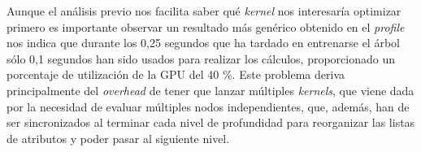 Aunque el análisis previo nos facilita saber qué \textit{kernel} nos interesaría optimizar primero es importante observar un resultado más genérico obtenido en el \textit{profile} nos indica que durante los 0,25 segundos que ha tardado en entrenarse el árbol sólo 0,1 segundos han sido usados para realizar los cálculos, proporcionado un porcentaje de utilización de la GPU del 40 \%. Este problema deriva principalmente del \textit{overhead} de tener que lanzar múltiples \textit{kernels}, que viene dada por la necesidad de evaluar múltiples nodos independientes, que, además, han de ser sincronizados al terminar cada nivel de profundidad para reorganizar las listas de atributos y poder pasar al siguiente nivel.